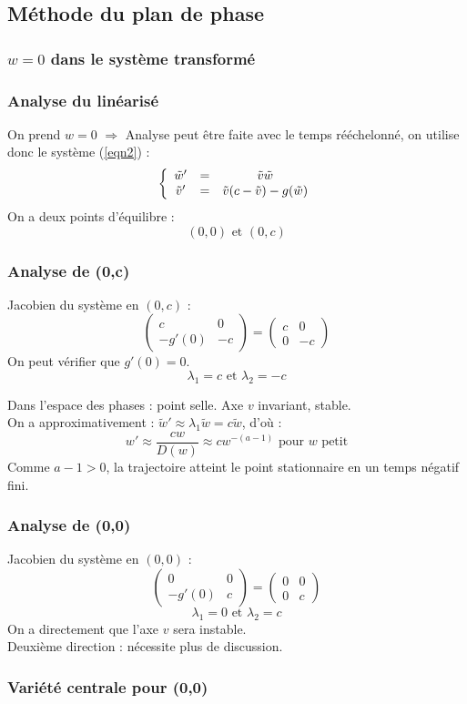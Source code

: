\documentclass[handout]{beamer}
\begin{document}
\subsection{Méthode du plan de phase}
\subsubsection{$w=0$ dans le système transformé}

\begin{frame}
	\frametitle{Analyse du linéarisé}
On prend $w=0$ $\Rightarrow$ Analyse peut être faite avec le temps rééchelonné, on utilise donc le système (\ref{eqn2}) : 
\[\left\{ \begin{array}{c c c}
	\tilde{w}' &=& \tilde{v}\tilde{w} \\
	\tilde{v}' &=& \tilde{v}(c-\tilde{v})-g(\tilde{w})
\end{array} \right.\]
On a deux points d'équilibre : \[(0,0) \text{ et } (0,c)\]
\end{frame}

\begin{frame}
	\frametitle{Analyse de (0,c)}
Jacobien du système en $(0,c)$ : \[\begin{pmatrix} c & 0 \\ -g'(0) & -c \end{pmatrix} = \begin{pmatrix} c & 0 \\ 0 & -c \end{pmatrix}\]
On peut vérifier que $g'(0)=0$.\\
\[\lambda_1=c \text{ et } \lambda_2=-c\]

Dans l'espace des phases : point selle. Axe $v$ invariant, stable. \\
On a approximativement : $\tilde{w}'\approx \lambda_1 \tilde{w} = c\tilde{w}$, d'où : 
\[w'\approx \frac{cw}{D(w)} \approx cw^{-(a-1)} \text{ pour } w \text{ petit}\]
Comme $a-1>0$, la trajectoire atteint le point stationnaire en un temps négatif fini.
\end{frame}

\begin{frame}
	\frametitle{Analyse de (0,0)}
Jacobien du système en $(0,0)$ : \[\begin{pmatrix} 0 & 0 \\ -g'(0) & c \end{pmatrix} = \begin{pmatrix} 0 & 0 \\ 0 & c \end{pmatrix}\]
\[\lambda_1=0 \text{ et } \lambda_2=c\]
On a directement que l'axe $v$ sera instable.\\
Deuxième direction : nécessite plus de discussion.
\end{frame}

\begin{frame}
	\frametitle{Variété centrale pour (0,0)}
\end{frame}
\end{document}
